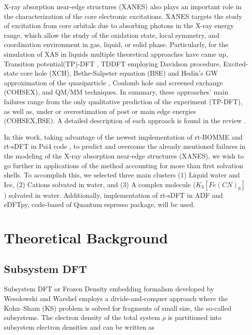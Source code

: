 \documentclass[notitlepage,12pt]{report}
\begin{document}
	X-ray absorption near-edge structures (XANES) also plays an important role in the characterization of the core electronic excitations. XANES targets the study of excitation from core orbitals due to absorbing photons in the X-ray energy range\supercite{fransson2016x}, which allow the study of the oxidation state, local symmetry, and coordination environment in gas, liquid, or solid phase\supercite{rehr2005progress,koningsberger1987x}. 
	Particularly, for the simulation of XAS in liquids multiple theoretical approaches have came up, Transition potential(TP)-DFT \supercite{triguero1998calculations}, TDDFT employing Davidson procedure\supercite{davidson197514}, Excited-state core hole (XCH)\supercite{prendergast2006x}, Bethe-Salpeter equation (BSE) and Hedin’s GW approximation of the quasiparticle \supercite{vinson2012theoretical}, Coulomb hole and screened exchange (COHSEX)\supercite{chen2010x}, and QM/MM techniques\supercite{list2014lanczos}. In summary, these approaches’ main failures range from the only qualitative prediction of the experiment (TP-DFT), as well as, under or overestimation of post or main edge energies (COHSEX,BSE). A detailed description of each approach is found in the review \cite{fransson2016x}.
	
	In this work, taking advantage of the newest implementation of rt-BOMME and rt-sDFT \supercite{de2021environment} in Psi4 code \supercite{smith2020psi4}, to predict and overcome the already mentioned failures in the modeling of the X-ray absorption near-edge structures (XANES), we wish to go further in applications of the method accounting for more than first solvation shells. To accomplish this, we selected three main clusters (1) Liquid water and Ice, (2) Cations solvated in water, and (3) A complex molecule ($K_3[Fe(CN)_6]$) solvated in water. Additionally, implementation of rt-sDFT in ADF\supercite{te2001chemistry} and eDFTpy\supercite{edftpy}, code-based of Quantum espresso package\supercite{giannozzi2009quantum}, will be used.

\section{Theoretical Background}

\subsection{Subsystem DFT}
Subsystem DFT or Frozen Density embedding formalism developed by Wesolowski and Warshel employs a divide-and-conquer approach where the Kohn--Sham (KS) problem is solved for fragments of small size, the so-called subsystems\supercite{sDFT,wesolowski1993frozen,wesolowski2006one}. The electron density of the total system $\rho$ is partitioned into subsystem electron densities and can be written as
\end{document}
